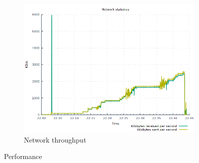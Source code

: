 \begin{figure}[h!]
{\begin{subfigure}[b]{.4\textwidth}
      \includegraphics[width=0.95\linewidth]{./context/figures/rpi_netinterface.png}
      \caption{Network throughput}
      \label{fig:rpi_netinterface}
    \end{subfigure}%
  }
  \caption{Performance}
  \label{fig:result_rpi}
\end{figure}

\EndChapter
